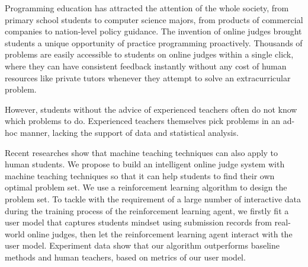 \begin{englishabstract}

    Programming education has attracted the attention of the whole society,
    from primary school students to computer science majors,
    from products of commercial companies to nation-level policy guidance.
    The invention of online judges brought students a unique opportunity of practice programming proactively.
    Thousands of problems are easily accessible to students on online judges within a single click,
    where they can have consistent feedback instantly without any cost of human resources like private tutors
    whenever they attempt to solve an extracurricular problem.

    However, students without the advice of experienced teachers often do not know which problems to do.
    Experienced teachers themselves pick problems in an ad-hoc manner,
    lacking the support of data and statistical analysis.

    Recent researches show that machine teaching techniques can also apply to human students.
    We propose to build an intelligent online judge system with machine teaching techniques
    so that it can help students to find their own optimal problem set.
    We use a reinforcement learning algorithm to design the problem set.
    To tackle with the requirement of a large number of interactive data
    during the training process of the reinforcement learning agent,
    we firstly fit a user model that captures students mindset using submission records from real-world online judges,
    then let the reinforcement learning agent interact with the user model.
    Experiment data show that our algorithm outperforms baseline methods and human teachers,
    based on metrics of our user model.

\end{englishabstract}

